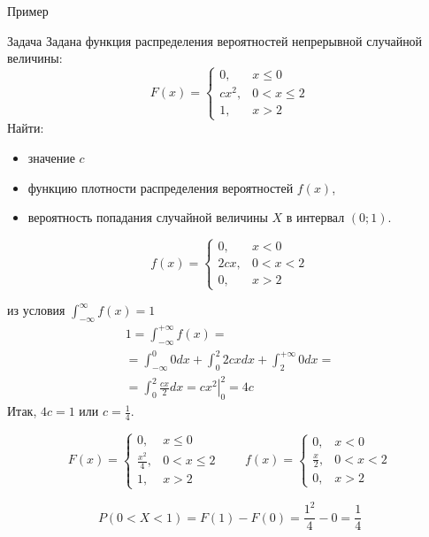 \documentclass[unicode,11pt,notheorems,xcolor=table]{beamer}
\begin{document}
\begin{frame}[allowframebreaks]{Пример}{}
    \begin{exampleblock}{Задача}
        Задана функция распределения вероятностей непрерывной случайной величины:
        $$F(x) = \begin{cases}
            0, & x\leqslant 0\\
            cx^2, & 0<x\leqslant 2\\
            1, &  x>2
        \end{cases}
        $$        
        Найти: 
        \begin{itemize}
            \item значение $c$
            \item функцию плотности распределения вероятностей $f(x)$, 
            \item вероятность попадания случайной величины $X$ в интервал $(0;1)$.         
        \end{itemize}
    \end{exampleblock}
    \framebreak
    $$
    f(x) = \begin{cases}
        0, & x< 0\\
        2cx, & 0<x< 2\\
        0, &  x>2
    \end{cases}
    $$        

     из условия $\int_{-\infty}^{\infty} f(x)=1$
    \begin{multline*}
        1 = \int_{-\infty}^{+\infty} f(x) 
        =\\
         = \int_{-\infty}^0 0dx + \int_{0}^2 2cx dx + \int_2^{+\infty} 0dx  
         =\\
         = \int_{0}^2 \frac{cx}{2} dx
        = \left. cx^2 \right|_0^2 = 4c 
    \end{multline*}
    Итак, $4c=1$ или $c= \frac{1}{4}$.

    \framebreak
    $$
        F(x) = \begin{cases}
            0, & x\leqslant 0\\
            \frac{x^2}{4}, & 0<x\leqslant 2\\
            1, &  x>2
        \end{cases}
        \qquad
        f(x) = \begin{cases}
            0, & x< 0\\
            \frac{x}{2}, & 0<x< 2\\
            0, &  x>2
        \end{cases}
    $$ 
    
    $$
        P(0<X<1) = F(1)-F(0) = \frac{1^2}{4}-0 = \frac{1}{4}
    $$

\end{frame}
\end{document}
